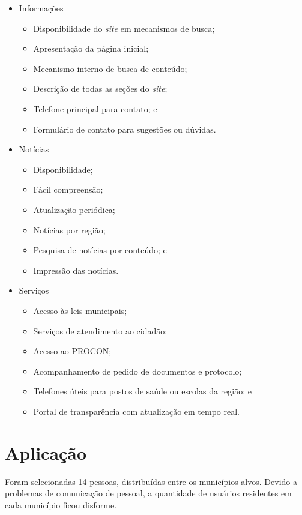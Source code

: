 \documentclass{article}
\begin{document}
\begin{itemize}
  \item Informações
  \begin{itemize}
    \item Disponibilidade do \textit{site} em mecanismos de busca;
    \item Apresentação da página inicial;
    \item Mecanismo interno de busca de conteúdo;
    \item Descrição de todas as seções do \textit{site};
    \item Telefone principal para contato; e
    \item Formulário de contato para sugestões ou dúvidas.
  \end{itemize}
  \item Notícias
  \begin{itemize}
    \item Disponibilidade;
    \item Fácil compreensão;
    \item Atualização periódica;
    \item Notícias por região;
    \item Pesquisa de notícias por conteúdo; e
    \item Impressão das notícias.
  \end{itemize}
  \item Serviços
  \begin{itemize}
    \item Acesso às leis municipais;
    \item Serviços de atendimento ao cidadão;
    \item Acesso ao PROCON;
    \item Acompanhamento de pedido de documentos e protocolo;
    \item Telefones úteis para postos de saúde ou escolas da região; e
    \item Portal de transparência com atualização em tempo real.
  \end{itemize}
\end{itemize}

\section{Aplicação}
\label{sec:aplicacao}

Foram selecionadas 14 pessoas, distribuídas entre os municípios alvos. Devido a
problemas de comunicação de pessoal, a quantidade de usuários residentes em cada
município ficou disforme.
\end{document}
